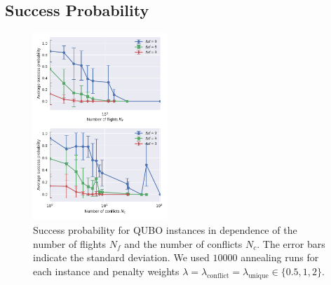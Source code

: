 \subsection{Success Probability}

\begin{figure}[htpb]
    \centering
    \includegraphics[width=0.45\textwidth]{./pics/annealing_results_success_vs_flights_and_conflicts.pdf}
    \caption{Success probability for QUBO instances in dependence of the number of flights $N_f$ and the number of conflicts $N_c$. 
             The error bars indicate the standard deviation.
             We used $10000$ annealing runs for each instance and penalty weights $\lambda = \lambda_\text{conflict} = \lambda_\text{unique} \in \{0.5, 1, 2\}$. 
    }
\label{fig:success_probability}
\end{figure}

